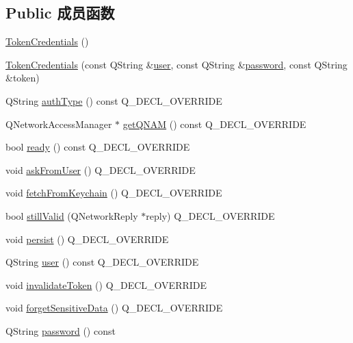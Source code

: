 \subsection*{Public 成员函数}
\begin{DoxyCompactItemize}
\item 
\hyperlink{class_o_c_c_1_1_token_credentials_aebe77379b2f23d7777746ecffb56b1b3}{Token\+Credentials} ()
\item 
\hyperlink{class_o_c_c_1_1_token_credentials_af487ba4449b68200f27bd93cb235eaaa}{Token\+Credentials} (const Q\+String \&\hyperlink{class_o_c_c_1_1_token_credentials_ab431dd443d32749da91f05f490a9e896}{user}, const Q\+String \&\hyperlink{class_o_c_c_1_1_token_credentials_a1e45d852019e4acd897b771c2ba111ea}{password}, const Q\+String \&token)
\item 
Q\+String \hyperlink{class_o_c_c_1_1_token_credentials_a6d8de7c4c65b7b08cfd86a140afa51a9}{auth\+Type} () const Q\+\_\+\+D\+E\+C\+L\+\_\+\+O\+V\+E\+R\+R\+I\+DE
\item 
Q\+Network\+Access\+Manager $\ast$ \hyperlink{class_o_c_c_1_1_token_credentials_af5d6eb118b0d49adb6f6a2d572d157e6}{get\+Q\+N\+AM} () const Q\+\_\+\+D\+E\+C\+L\+\_\+\+O\+V\+E\+R\+R\+I\+DE
\item 
bool \hyperlink{class_o_c_c_1_1_token_credentials_aa6e69c01e9e6463650d169aae84393e8}{ready} () const Q\+\_\+\+D\+E\+C\+L\+\_\+\+O\+V\+E\+R\+R\+I\+DE
\item 
void \hyperlink{class_o_c_c_1_1_token_credentials_a789e2534ba7df8f349903bb5b2a39167}{ask\+From\+User} () Q\+\_\+\+D\+E\+C\+L\+\_\+\+O\+V\+E\+R\+R\+I\+DE
\item 
void \hyperlink{class_o_c_c_1_1_token_credentials_a6089c9b79dc88288db02f0fb059c7827}{fetch\+From\+Keychain} () Q\+\_\+\+D\+E\+C\+L\+\_\+\+O\+V\+E\+R\+R\+I\+DE
\item 
bool \hyperlink{class_o_c_c_1_1_token_credentials_a6d0a8caf7e4b1b7f54890301cb7e30ef}{still\+Valid} (Q\+Network\+Reply $\ast$reply) Q\+\_\+\+D\+E\+C\+L\+\_\+\+O\+V\+E\+R\+R\+I\+DE
\item 
void \hyperlink{class_o_c_c_1_1_token_credentials_a3a158c2e76d58356c976ca410a7e64c1}{persist} () Q\+\_\+\+D\+E\+C\+L\+\_\+\+O\+V\+E\+R\+R\+I\+DE
\item 
Q\+String \hyperlink{class_o_c_c_1_1_token_credentials_ab431dd443d32749da91f05f490a9e896}{user} () const Q\+\_\+\+D\+E\+C\+L\+\_\+\+O\+V\+E\+R\+R\+I\+DE
\item 
void \hyperlink{class_o_c_c_1_1_token_credentials_a8d2456b0fb01c7b69dece6a762dd16b5}{invalidate\+Token} () Q\+\_\+\+D\+E\+C\+L\+\_\+\+O\+V\+E\+R\+R\+I\+DE
\item 
void \hyperlink{class_o_c_c_1_1_token_credentials_a5775fc2e216e7e26cf5f1adc764641d7}{forget\+Sensitive\+Data} () Q\+\_\+\+D\+E\+C\+L\+\_\+\+O\+V\+E\+R\+R\+I\+DE
\item 
Q\+String \hyperlink{class_o_c_c_1_1_token_credentials_a1e45d852019e4acd897b771c2ba111ea}{password} () const
\end{DoxyCompactItemize}
